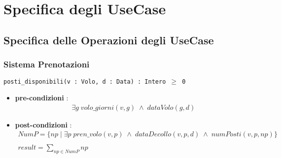 \documentclass[12pt, letterpaper]{article}
\newcommand{\code}[1]{\colorbox{light-gray}{\texttt{#1}}}
\begin{document}
\section{Specifica degli UseCase}
\subsection{Specifica delle Operazioni degli UseCase}
\subsubsection{Sistema Prenotazioni}
\code{posti\_disponibili(v : Volo, d : Data) : Intero $\ge$ 0}\begin{itemize}
    \item \textbf{pre-condizioni} : $$\begin{matrix}
        \exists g\; volo\_giorni(v,g) \;\land\; dataVolo(g,d)
    \end{matrix}$$
    \item \textbf{post-condizioni} : $$\begin{matrix}
        NumP = \big\{ np \;|\; \exists p\;pren\_volo(v,p)\;\land\;dataDecollo(v,p,d)\;\land\;numPosti(v,p,np)  \big\}\\ \\ 
        result = \displaystyle\sum_{np\in NumP}np
    \end{matrix} $$
\end{itemize}
\end{document}
